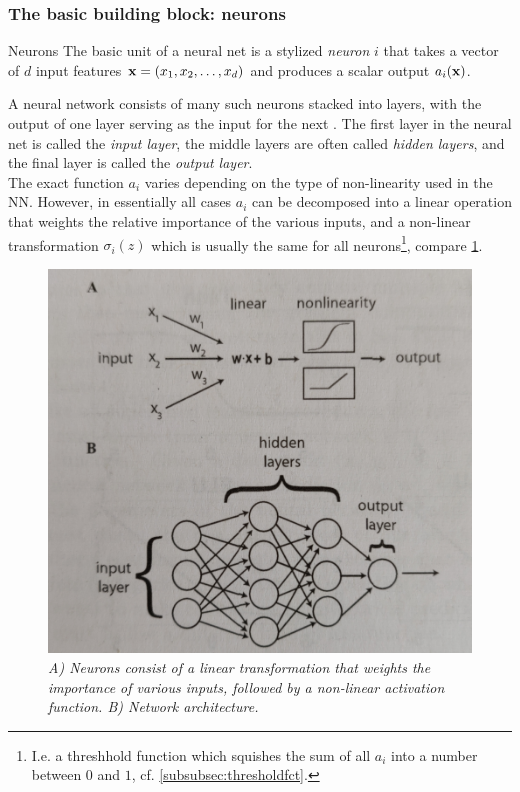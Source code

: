 \subsubsection{The basic building block: neurons}
\label{subsubsec:dnnNeurons}
\begin{mybox}{Neurons}
The basic unit of a neural net is a stylized \emph{neuron} $i$ that takes a vector of $d$ input features $\mathbf{x}=(x_1,x_2,\dots,x_d)$ and produces a scalar output $a_i(\mathbf{x})$. 
\end{mybox}
A neural network consists of many such neurons stacked into layers, with the output of one layer serving as the input for the next . The first layer in the neural net is called the \emph{input layer}, the middle layers are often called \emph{hidden layers}, and the final layer is called the \emph{output layer}.\\
The exact function $a_i$ varies depending on the type of non-linearity used in the NN. However, in essentially all cases $a_i$ can be decomposed into a linear operation that weights the relative importance of the various inputs, and a non-linear transformation $\sigma_i(z)$ which is usually the same for all neurons\footnote{I.e. a threshhold function which squishes the sum of all $a_i$ into a number between $0$ and $1$, cf. \ref{subsubsec:thresholdfct}.}, compare \ref{fig:neuron}. 

\begin{figure}[h!]
	\centering
	\includegraphics[width=0.7\linewidth]{gfx/Neuron}
	\caption{\itshape A) Neurons consist of a linear transformation that weights the importance of various inputs, followed by a non-linear activation function. B) Network architecture.}
	\label{fig:neuron}
\end{figure}





